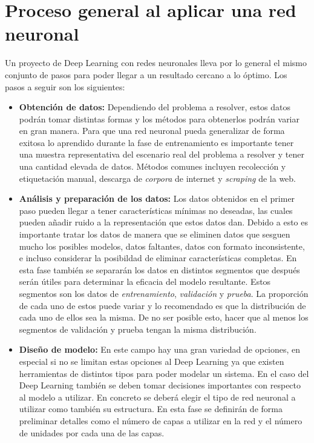 \section{Proceso general al aplicar una red neuronal}
\label{sec:nlpprocess}

Un proyecto de Deep Learning con redes neuronales lleva por lo general el mismo conjunto de pasos para poder llegar a un resultado cercano a lo óptimo. Los pasos a seguir son los siguientes:

\begin{itemize}
\item \textbf{Obtención de datos:} Dependiendo del problema a resolver, estos datos podrán tomar distintas formas y los métodos para obtenerlos podrán variar en gran manera. Para que una red neuronal pueda generalizar de forma exitosa lo aprendido durante la fase de entrenamiento es importante tener una muestra representativa del escenario real del problema a resolver y tener una cantidad elevada de datos. Métodos comunes incluyen recolección y etiquetación manual, descarga de \textit{\gls{corpora}} de internet y \textit{\gls{scraping}} de la web.

\item \textbf{Análisis y preparación de los datos:} Los datos obtenidos en el primer paso pueden llegar a tener características mínimas no deseadas, las cuales pueden añadir ruido a la representación que estos datos dan. Debido a esto es importante tratar los datos de manera que se eliminen datos que sesguen mucho los posibles modelos, datos faltantes, datos con formato inconsistente, e incluso considerar la posibildad de eliminar características completas. En esta fase también se separarán los datos en distintos segmentos que después serán útiles para determinar la eficacia del modelo resultante. Estos segmentos son los datos de \textit{entrenamiento}, \textit{validación} y \textit{prueba}. La proporción de cada uno de estos puede variar y lo recomendado es que la distribución de cada uno de ellos sea la misma. De no ser posible esto, hacer que al menos los segmentos de validación y prueba tengan la misma distribución.

\item \textbf{Diseño de modelo:} En este campo hay una gran variedad de opciones, en especial si no se limitan estas opciones al Deep Learning ya que existen herramientas de distintos tipos para poder modelar un sistema. En el caso del Deep Learning también se deben tomar decisiones importantes con respecto al modelo a utilizar. En concreto se deberá elegir el tipo de red neuronal a utilizar como también su estructura. En esta fase se definirán de forma preliminar detalles como el número de capas a utilizar en la red y el número de unidades por cada una de las capas.


\end{itemize}
